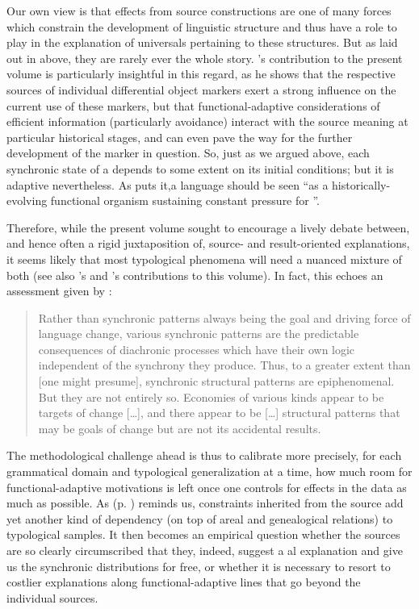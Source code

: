 \documentclass[output=paper]{langsci/langscibook}
\begin{document}
Our own view is that  effects from source constructions are one of many forces which constrain the development of linguistic structure and thus have a role to play in the explanation of universals pertaining to these structures. But as laid out in  above, they are rarely ever the whole story. ’s contribution to the present volume is particularly insightful in this regard, as he shows that the respective sources of individual differential object markers exert a strong influence on the current use of these markers, but that functional-adaptive considerations of efficient information  (particularly  avoidance) interact with the source meaning at particular historical stages, and can even pave the way for the further development of the marker in question. So, just as we argued above, each synchronic state of a  depends to some extent on its initial conditions; but it is adaptive nevertheless. As \citet[263]{Shibatani2006} puts it,\largerpage a language should be seen “as a historically-evolving functional organism sustaining constant pressure for ”. 

\newpage 
Therefore, while the present volume sought to encourage a lively debate between, and hence often a rigid juxtaposition of, source- and result-oriented explanations, it seems likely that most typological phenomena will need a nuanced mixture of both (see also ’s and ’s contributions to this volume). In fact, this echoes an assessment given by \citet[287--288]{Nichols2008_Diach}:


\begin{quote}
Rather than synchronic patterns always being the goal and driving force of language change, various synchronic patterns are the predictable consequences of diachronic processes which have their own logic independent of the synchrony they produce. Thus, to a greater extent than [one might presume], synchronic structural patterns are epiphenomenal. But they are not entirely so. Economies of various kinds appear to be targets of change […], and there appear to be […] structural patterns that may be goals of change but are not its accidental results.
\end{quote}

The methodological challenge ahead is thus to calibrate more precisely, for each grammatical domain and typological generalization at a time, how much room for functional-adaptive motivations is left once one controls for  effects in the data as much as possible. As  (p. \pageref{p:collins:dependency}) reminds us, constraints inherited from the source add yet another kind of dependency (on top of areal and genealogical relations) to typological samples. It then becomes an empirical question whether the sources are so clearly circumscribed that they, indeed, suggest a al explanation and give us the synchronic distributions for free, or whether it is necessary to resort to costlier explanations along functional-adaptive lines that go beyond the individual sources.
\end{document}
